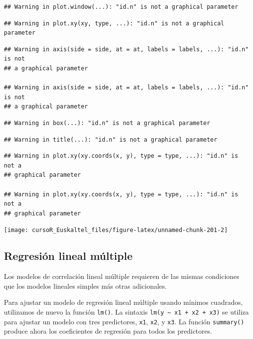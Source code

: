 \documentclass[]{book}
\begin{document}
\begin{verbatim}
## Warning in plot.window(...): "id.n" is not a graphical parameter
\end{verbatim}

\begin{verbatim}
## Warning in plot.xy(xy, type, ...): "id.n" is not a graphical parameter
\end{verbatim}

\begin{verbatim}
## Warning in axis(side = side, at = at, labels = labels, ...): "id.n" is not
## a graphical parameter

## Warning in axis(side = side, at = at, labels = labels, ...): "id.n" is not
## a graphical parameter
\end{verbatim}

\begin{verbatim}
## Warning in box(...): "id.n" is not a graphical parameter
\end{verbatim}

\begin{verbatim}
## Warning in title(...): "id.n" is not a graphical parameter
\end{verbatim}

\begin{verbatim}
## Warning in plot.xy(xy.coords(x, y), type = type, ...): "id.n" is not a
## graphical parameter

## Warning in plot.xy(xy.coords(x, y), type = type, ...): "id.n" is not a
## graphical parameter
\end{verbatim}

\begin{center}\texttt{[image: cursoR\_Euskaltel\_files/figure-latex/unnamed-chunk-201-2]} \end{center}

\subsection{Regresión lineal múltiple}\label{regresion-lineal-multiple}

Los modelos de correlación lineal múltiple requieren de las mismas
condiciones que los modelos lineales simples más otras adicionales.

Para ajustar un modelo de regresión lineal múltiple usando mínimos
cuadrados, utilizamos de nuevo la función \texttt{lm()}. La sintaxis
\texttt{lm(y\ \textasciitilde{}\ x1\ +\ x2\ +\ x3)} se utiliza para
ajustar un modelo con tres predictores, \texttt{x1}, \texttt{x2}, y
\texttt{x3}. La función \texttt{summary()} produce ahora los
coeficientes de regresión para todos los predictores.
\end{document}
